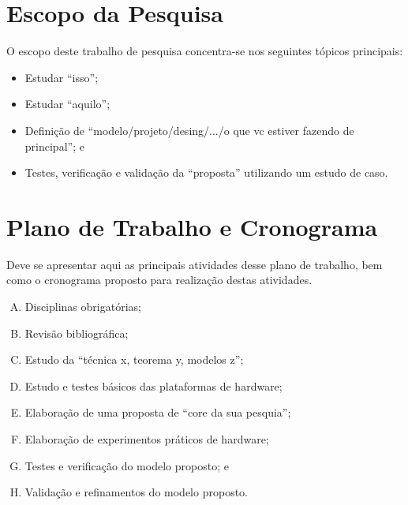 \documentclass[12pt,a4paper]{article}
\begin{document}
\section{Escopo da Pesquisa}
\label{sec:escopo-da-pesquisa}
O escopo deste trabalho de pesquisa concentra-se nos seguintes tópicos principais:

\begin{itemize}
\item Estudar ``isso'';
\item Estudar ``aquilo'';
\item Definição de ``modelo/projeto/desing/.../o que vc estiver fazendo de principal''; e
\item Testes, verificação e validação da ``proposta'' utilizando um estudo de caso.
\end{itemize}


\section{Plano de Trabalho e Cronograma}
\label{sec:plano-trabalho-cronograma}
Deve se apresentar aqui as principais atividades desse plano de trabalho, bem como o cronograma proposto para realização destas atividades.

\begin{enumerate}[A.]
  \item Disciplinas obrigatórias;
  \item Revisão bibliográfica;  
  \item Estudo da ``técnica x, teorema y, modelos z'';  
  \item Estudo e testes básicos das plataformas de hardware;  
  \item Elaboração de uma proposta de ``core da sua pesquia'';
  \item Elaboração de experimentos práticos de hardware;  
  \item Testes e verificação do modelo proposto; e    
  \item Validação e refinamentos do modelo proposto.   
\end{enumerate}
\end{document}
